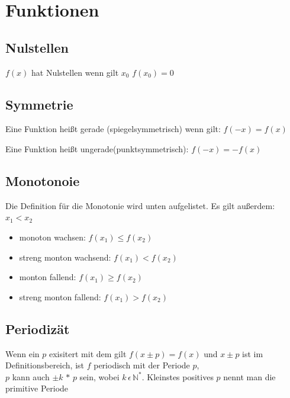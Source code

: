 \documentclass[a4paper]{scrartcl}
\begin{document}
    \section{Funktionen}

    \subsection{Nulstellen}
    $f(x)$ hat Nulstellen wenn gilt $x_0$  $f(x_0) = 0$

    \subsection{Symmetrie}
    \begin{description}
        \item Eine Funktion heißt gerade (spiegelsymmetrisch) wenn gilt: $f(-x) = f(x)$ 
        \item Eine Funktion heißt ungerade(punktsymmetrisch): $f(-x) = -f(x)$
    \end{description}
    
    \subsection{Monotonoie} 
    Die Definition für die Monotonie wird unten aufgelistet. Es gilt außerdem: $x_1 < x_2 $ 
    \begin{itemize}
        \item monoton wachsen:  $f(x_1) \leq f(x_2)$
        \item streng monton wachsend: $f(x_1) < f(x_2)$
        \item monton fallend:  $f(x_1) \geq f(x_2)$
        \item streng monton fallend:  $f(x_1) > f(x_2)$
    \end{itemize}
    
    \subsection{Periodizät}
    Wenn ein $p$ exisitert mit dem gilt $f(x \pm p) = f(x)$ und $x \pm p$ ist im Definitionsbereich, ist $f$ periodisch mit der Periode $p$,\\
    $p$ kann auch $\pm k \, * \,p$ sein, wobei $k \, \epsilon \, \mathbb{N}^*$. Kleinstes positives $p$ nennt man die primitive Periode
    
\end{document}
